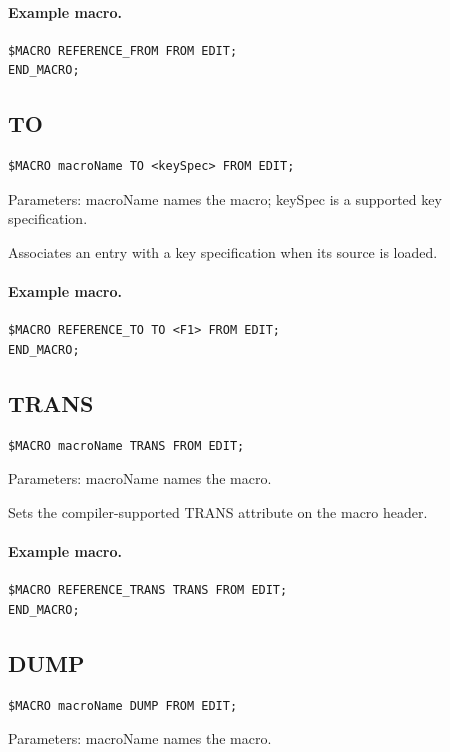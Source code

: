 \documentclass[a4paper,10pt,twoside,openany]{book}
\begin{document}
\paragraph{Example macro.}
\begin{verbatim}
$MACRO REFERENCE_FROM FROM EDIT;
END_MACRO;
\end{verbatim}

\label{prim:keyword-to}
\subsection*{TO}
\begin{verbatim}
$MACRO macroName TO <keySpec> FROM EDIT;
\end{verbatim}
Parameters: macroName names the macro; keySpec is a supported key specification.

Associates an entry with a key specification when its source is loaded.

\paragraph{Example macro.}
\begin{verbatim}
$MACRO REFERENCE_TO TO <F1> FROM EDIT;
END_MACRO;
\end{verbatim}

\label{prim:keyword-trans}
\subsection*{TRANS}
\begin{verbatim}
$MACRO macroName TRANS FROM EDIT;
\end{verbatim}
Parameters: macroName names the macro.

Sets the compiler-supported TRANS attribute on the macro header.

\paragraph{Example macro.}
\begin{verbatim}
$MACRO REFERENCE_TRANS TRANS FROM EDIT;
END_MACRO;
\end{verbatim}

\label{prim:keyword-dump}
\subsection*{DUMP}
\begin{verbatim}
$MACRO macroName DUMP FROM EDIT;
\end{verbatim}
Parameters: macroName names the macro.
\end{document}
